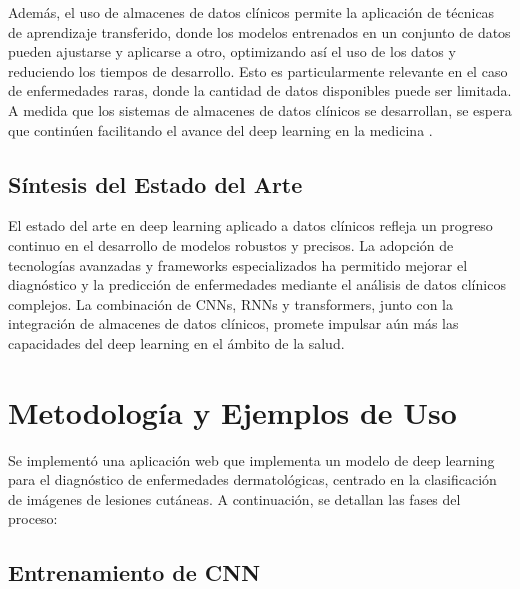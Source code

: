 \documentclass{article}
\begin{document}
Además, el uso de almacenes de datos clínicos permite la aplicación de técnicas de aprendizaje transferido, donde los modelos entrenados en un conjunto de datos pueden ajustarse y aplicarse a otro, optimizando así el uso de los datos y reduciendo los tiempos de desarrollo. Esto es particularmente relevante en el caso de enfermedades raras, donde la cantidad de datos disponibles puede ser limitada. A medida que los sistemas de almacenes de datos clínicos se desarrollan, se espera que continúen facilitando el avance del deep learning en la medicina \cite{shickel2017deep}.

\subsection{Síntesis del Estado del Arte}

El estado del arte en deep learning aplicado a datos clínicos refleja un progreso continuo en el desarrollo de modelos robustos y precisos. La adopción de tecnologías avanzadas y frameworks especializados ha permitido mejorar el diagnóstico y la predicción de enfermedades mediante el análisis de datos clínicos complejos. La combinación de CNNs, RNNs y transformers, junto con la integración de almacenes de datos clínicos, promete impulsar aún más las capacidades del deep learning en el ámbito de la salud.
\\

\section{Metodología y Ejemplos de Uso}
\label{sec:metodologia_ejemplos}

Se implementó una aplicación web que implementa un modelo de deep learning para el diagnóstico de enfermedades dermatológicas, centrado en la clasificación de imágenes de lesiones cutáneas. A continuación, se detallan las fases del proceso:


\subsection{Entrenamiento de CNN}
\end{document}
